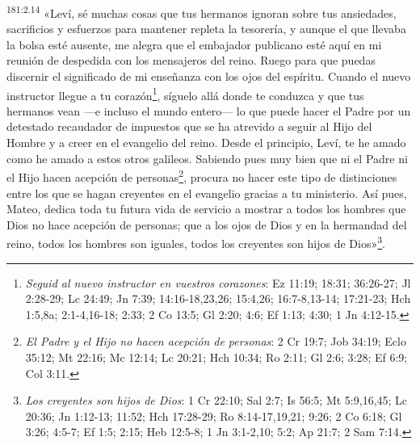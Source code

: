 \par
\textsuperscript{181:2.14} «Leví, sé muchas cosas que tus hermanos ignoran sobre tus ansiedades, sacrificios y esfuerzos para mantener repleta la tesorería, y aunque el que llevaba la bolsa esté ausente, me alegra que el embajador publicano esté aquí en mi reunión de despedida con los mensajeros del reino. Ruego para que puedas discernir el significado de mi enseñanza con los ojos del espíritu. Cuando el nuevo instructor llegue a tu corazón\footnote{\textit{Seguid al nuevo instructor en vuestros corazones}: Ez 11:19; 18:31; 36:26-27; Jl 2:28-29; Lc 24:49; Jn 7:39; 14:16-18,23,26; 15:4,26; 16:7-8,13-14; 17:21-23; Hch 1:5,8a; 2:1-4,16-18; 2:33; 2 Co 13:5; Gl 2:20; 4:6; Ef 1:13; 4:30; 1 Jn 4:12-15.}, síguelo allá donde te conduzca y que tus hermanos vean ---e incluso el mundo entero--- lo que puede hacer el Padre por un detestado recaudador de impuestos que se ha atrevido a seguir al Hijo del Hombre y a creer en el evangelio del reino. Desde el principio, Leví, te he amado como he amado a estos otros galileos. Sabiendo pues muy bien que ni el Padre ni el Hijo hacen acepción de personas\footnote{\textit{El Padre y el Hijo no hacen acepción de personas}: 2 Cr 19:7; Job 34:19; Eclo 35:12; Mt 22:16; Mc 12:14; Lc 20:21; Hch 10:34; Ro 2:11; Gl 2:6; 3:28; Ef 6:9; Col 3:11.}, procura no hacer este tipo de distinciones entre los que se hagan creyentes en el evangelio gracias a tu ministerio. Así pues, Mateo, dedica toda tu futura vida de servicio a mostrar a todos los hombres que Dios no hace acepción de personas; que a los ojos de Dios y en la hermandad del reino, todos los hombres son iguales, todos los creyentes son hijos de Dios»\footnote{\textit{Los creyentes son hijos de Dios}: 1 Cr 22:10; Sal 2:7; Is 56:5; Mt 5:9,16,45; Lc 20:36; Jn 1:12-13; 11:52; Hch 17:28-29; Ro 8:14-17,19,21; 9:26; 2 Co 6:18; Gl 3:26; 4:5-7; Ef 1:5; 2:15; Heb 12:5-8; 1 Jn 3:1-2,10; 5:2; Ap 21:7; 2 Sam 7:14.}.

